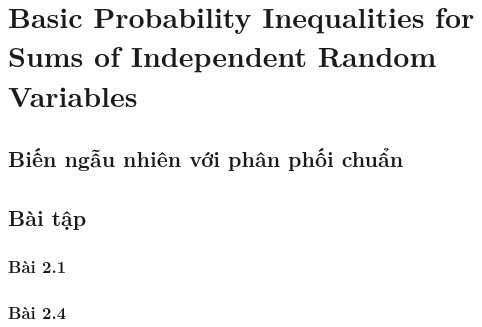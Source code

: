 \chapter{Basic Probability Inequalities for Sums of
Independent Random Variables}

\section{Biến ngẫu nhiên với phân phối chuẩn}

\section{Bài tập}

\subsection{Bài 2.1}


\subsection{Bài 2.4}
